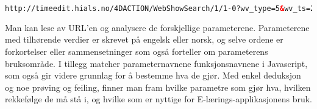 \documentclass[../main.tex]{subfiles}
\begin{document}
\begin{lstlisting}[language=HTML, frame=single, caption={En URL generert når man søker etter en timeplan for ett spesifikt fag}]
http://timeedit.hials.no/4DACTION/WebShowSearch/1/1-0?wv_type=5&wv_ts=20130511T191704X3729&wv_search=&wv_startWeek=1301&wv_stopWeek=1318&wv_first=0&wv_addObj=&wv_delObj=&wv_obj1=174000&wv_text=Tekstformat
\end{lstlisting}

Man kan lese av URL’en og analysere de forskjellige parameterene. Parameterene med tilhørende verdier er skrevet på engelsk eller norsk, og selve ordene er forkortelser eller sammensetninger som også forteller om parameterens bruksområde.  I tillegg matcher parameternavnene funksjonsnavnene i Javascript, som også gir videre grunnlag for å bestemme hva de gjør. Med enkel deduksjon og noe prøving og feiling, finner man fram hvilke parametre som gjør hva, hvilken rekkefølge de må stå i, og hvilke som er nyttige for E-lærings-applikasjonens bruk.
\end{document}
